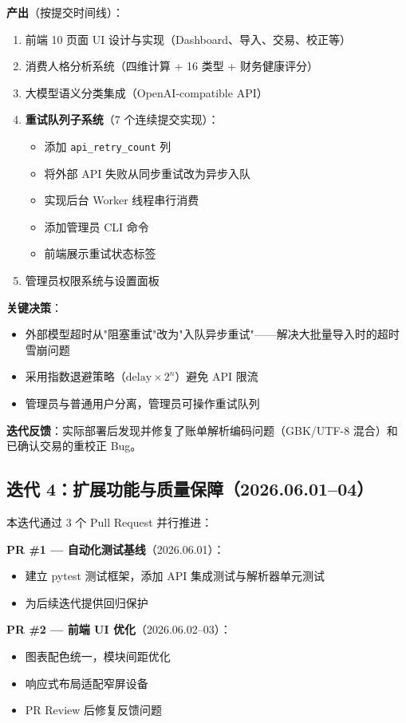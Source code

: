 \textbf{产出}（按提交时间线）：
\begin{enumerate}
  \item 前端 10 页面 UI 设计与实现（Dashboard、导入、交易、校正等）
  \item 消费人格分析系统（四维计算 + 16 类型 + 财务健康评分）
  \item 大模型语义分类集成（OpenAI-compatible API）
  \item \textbf{重试队列子系统}（7 个连续提交实现）：
    \begin{itemize}
      \item 添加 \texttt{api\_retry\_count} 列
      \item 将外部 API 失败从同步重试改为异步入队
      \item 实现后台 Worker 线程串行消费
      \item 添加管理员 CLI 命令
      \item 前端展示重试状态标签
    \end{itemize}
  \item 管理员权限系统与设置面板
\end{enumerate}

\textbf{关键决策}：
\begin{itemize}
  \item 外部模型超时从"阻塞重试"改为"入队异步重试"——解决大批量导入时的超时雪崩问题
  \item 采用指数退避策略（$\text{delay} \times 2^n$）避免 API 限流
  \item 管理员与普通用户分离，管理员可操作重试队列
\end{itemize}

\textbf{迭代反馈}：实际部署后发现并修复了账单解析编码问题（GBK/UTF-8 混合）和已确认交易的重校正 Bug。

\subsection{迭代 4：扩展功能与质量保障（2026.06.01--04）}

本迭代通过 3 个 Pull Request 并行推进：

\textbf{PR \#1 — 自动化测试基线}（2026.06.01）：
\begin{itemize}
  \item 建立 pytest 测试框架，添加 API 集成测试与解析器单元测试
  \item 为后续迭代提供回归保护
\end{itemize}

\textbf{PR \#2 — 前端 UI 优化}（2026.06.02--03）：
\begin{itemize}
  \item 图表配色统一，模块间距优化
  \item 响应式布局适配窄屏设备
  \item PR Review 后修复反馈问题
\end{itemize}


